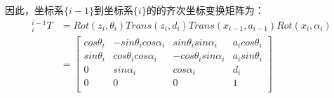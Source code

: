 \documentclass{seuthesis-2022}
\numberwithin{equation}{section}
\begin{document}
因此，坐标系$\{i-1\}$到坐标系$\{i\}$的的齐次坐标变换矩阵为：
\begin{equation}\label{eq:坐标系间变换}
\begin{aligned}
  ^{i-1}_{i}T &=Rot(z_{i},\theta_{i})Trans(z_{i},d_{i})Trans(x_{i-1},a_{i-1})Rot(x_{i},\alpha_{i})\\
              &=\begin{bmatrix}
                  cos\theta_{i} & -sin\theta_{i}cos\alpha_{i} & sin\theta_{i}sin\alpha_{i} & a_{i}cos\theta_{i}\\
                  sin\theta_{i} & cos\theta_{i}cos\alpha_{i} & -cos\theta_{i}sin\alpha_{i} & a_{i}sin\theta_{i}\\
                  0 & sin\alpha_{i} & cos\alpha_{i} & d_{i}\\
                  0 & 0 & 0 & 1\\
                \end{bmatrix}
\end{aligned}
\end{equation}
\end{document}
